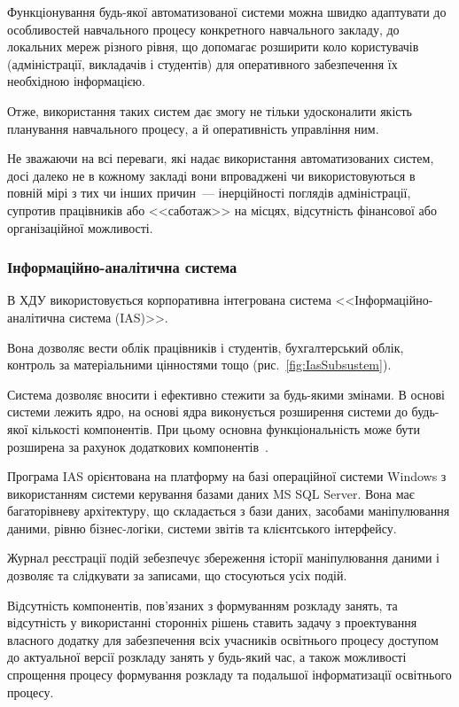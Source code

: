 Функціонування будь-якої автоматизованої системи можна швидко адаптувати до особливостей навчального процесу конкретного навчального закладу, до локальних мереж різного рівня, що допомагає розширити коло користувачів (адміністрації, викладачів і студентів) для оперативного забезпечення їх необхідною інформацією. 

Отже, використання таких систем дає змогу не тільки удосконалити якість планування навчального процесу, а й оперативність управління ним.

Не зважаючи на всі переваги, які надає використання автоматизованих систем, досі далеко не в кожному закладі вони впроваджені чи використовуються в повній мірі з тих чи інших причин~--- інерційності поглядів адміністрації, супротив працівників або <<саботаж>> на місцях, відсутність фінансової або організаційної можливості.

\subsubsection{Інформаційно-аналітична система} \label{subs:ias}

В ХДУ використовується корпоративна інтегрована система <<Інформаційно-аналітична система (IAS)>>.

Вона дозволяє вести облік працівників і студентів, бухгалтерський облік, контроль за матеріальними цінностями тощо (рис.~\ref{fig:IasSubsustem}). 

		
Система дозволяє вносити і ефективно стежити за будь-якими змінами. В основі системи лежить ядро, на основі ядра виконується розширення системи до будь-якої кількості компонентів. При цьому основна функціональність може бути розширена за рахунок додаткових компонентів~\cite{львов2007інформаційна}. 

Програма IAS орієнтована на платформу на базі операційної системи Windows з використанням системи керування базами даних MS SQL Server. Вона має багаторівневу архітектуру, що складається з бази даних, засобами маніпулювання даними, рівню бізнес-логіки, системи звітів та клієнтського інтерфейсу.

Журнал реєстрації подій зебезпечує збереження історії маніпулювання даними і дозволяє та слідкувати за записами, що стосуються усіх подій.

Відсутність компонентів, пов’язаних з формуванням розкладу занять, та відсутність у використанні сторонніх рішень ставить задачу з проектування власного додатку для забезпечення всіх учасників освітнього процесу доступом до актуальної версії розкладу занять у будь-який час, а також можливості спрощення процесу формування розкладу та подальшої інформатизації освітнього процесу.


